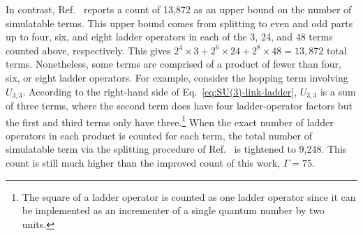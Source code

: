\documentclass[aps,prd,twocolumn,showpacs,groupedaddress,superscriptaddress,nofootinbib,floatfix,preprintnumbers,longbibliography]{revtex4-1}
\begin{document}
In contrast, Ref.~\cite{Kan:2021xfc} reports a count of 13,872 as an upper bound on the number of simulatable terms. This upper bound comes from splitting to even and odd parts up to four, six, and eight ladder operators in each of the 3, 24, and 48 terms counted above, respectively. This gives $2^4\times 3+2^6\times 24+2^8\times 48 =13,872$ total terms. Nonetheless, some terms are comprised of a product of fewer than four, six, or eight ladder operators. For example, consider the hopping term involving $U_{3,3}$. According to the right-hand side of Eq.~\eqref{eq:SU(3)-link-ladder}, $U_{3,3}$ is a sum of three terms, where the second term does have four ladder-operator factors but the first and third terms only have three.\footnote{The square of a ladder operator is counted as one ladder operator since it can be implemented as an incrementer of a single quantum number by two units.} When the exact number of ladder operators in each product is counted for each term, the total number of simulatable term via the splitting procedure of Ref.~\cite{Kan:2021xfc} is tightened to 9,248. This count is still much higher than the improved count of this work, $\Gamma=75$.

\end{document}
